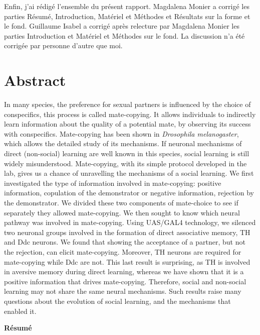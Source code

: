\documentclass[a4paper, 12pt]{article}
\begin{document}
	Enfin, j’ai rédigé l’ensemble du présent rapport. Magdalena Monier a corrigé les parties Résumé, Introduction, Matériel et Méthodes et Résultats sur la forme et le fond. Guillaume Isabel a corrigé après relecture par Magdalena Monier les parties Introduction et Matériel et Méthodes sur le fond. La discussion n’a été corrigée par personne d’autre que moi. 

\clearpage
	
	
	\vspace*{2cm}
	\tableofcontents
	
	\clearpage

\section{Abstract}
\begin{singlespace}
In many species, the preference for sexual partners is influenced by the choice of 
conspecifics, this process is called mate-copying. It allows individuals to indirectly learn information about the quality of a potential mate, by observing its success with conspecifics. Mate-copying has been shown in \textit{Drosophila melanogaster}, which allows the detailed study of its mechanisms. If neuronal mechanisms of direct (non-social) learning are well known in this species, social learning is still widely misunderstood. Mate-copying, with its simple protocol developed in the lab, gives us a chance of unravelling the mechanisms of a social learning. We first investigated the type of information involved in mate-copying: positive information, copulation of the demonstrator or negative information, rejection by the demonstrator. We divided these two components of mate-choice to see if separately they allowed mate-copying. We then sought to know which neural pathway was involved in mate-copying. Using UAS/GAL4 technology, we silenced two neuronal groups involved in the formation of direct associative memory, TH and Ddc neurons. We found that showing the acceptance of a partner, but not the rejection, can elicit mate-copying. Moreover, TH neurons are required for mate-copying while Ddc are not. This last result is surprising, as TH is involved in aversive memory during direct learning, whereas we have shown that it is a positive information that drives mate-copying. Therefore, social and non-social learning may not share the same neural mechanisms. Such results raise many questions about the evolution of social learning, and the mechanisms that enabled it.
\end{singlespace}
\medskip
\begin{large}
	\noindent
\textbf{Résumé}
\end{large}
\end{document}
